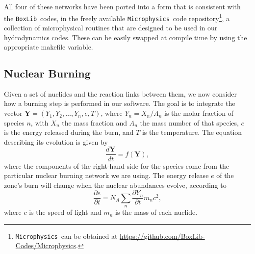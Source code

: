 \documentclass[twocolumn,numberedappendix]{../aastex6}
\newcommand{\boxlib}{\texttt{BoxLib}}
\newcommand{\microphysics}{\texttt{Microphysics}}
\begin{document}
All four of these networks have been ported into a form that is consistent
with the \boxlib\ codes, in the freely available \microphysics\ code
repository\footnote{\microphysics\ can be obtained at \url{https://github.com/BoxLib-Codes/Microphysics}.},
a collection of microphysical routines that are designed to be used in our
hydrodynamics codes. These can be easily swapped at compile time by using the 
appropriate makefile variable.

\subsection{Nuclear Burning}
\label{sec:burner}

Given a set of nuclides and the reaction links between them, we now consider
how a burning step is performed in our software. The goal is to integrate the
vector ${\bm{Y}} = (Y_1, Y_2, \ldots, Y_n, e, T)$, where $Y_{n} = X_{n} / A_{n}$
is the molar fraction of species $n$, with $X_n$ the mass fraction and $A_n$ the
mass number of that species, $e$ is the energy released during the burn, and
$T$ is the temperature. The equation describing its evolution is given by
\begin{equation}
  \frac{d\bm{Y}}{dt} = f(\mathbf{Y}),
\end{equation}
where the components of the right-hand-side for the species come from the particular
nuclear burning network we are using. The energy release $e$ of the zone's burn
will change when the nuclear abundances evolve, according to
\begin{equation}
  \frac{\partial e}{\partial t} = N_A \sum_{n} \frac{\partial Y_{n}}{\partial t} m_{n} c^2,
\end{equation}
where $c$ is the speed of light and $m_n$ is the mass of each nuclide.
\end{document}

